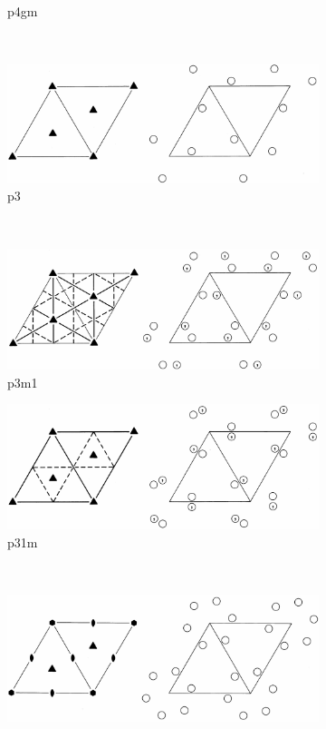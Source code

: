 \documentclass[12pt]{article}
\begin{document}
\begin{figure}
\begin{subfigure}[b]{0.5\textwidth}
        \caption*{p4gm}
    \end{subfigure}\\    
    \begin{subfigure}[b]{0.45\textwidth}
        \centering
        \includegraphics[width=\textwidth]{planegroups/13.png}
        \caption*{p3}
    \end{subfigure}
    ~
    \begin{subfigure}[b]{0.45\textwidth}
        \centering
        \includegraphics[width=\textwidth]{planegroups/14.png}
        \caption*{p3m1}
    \end{subfigure}
    \begin{subfigure}[b]{0.45\textwidth}
        \centering
        \includegraphics[width=\textwidth]{planegroups/15.png}
        \caption*{p31m}
    \end{subfigure}\\
    \begin{subfigure}[b]{0.45\textwidth}
        \centering
        \includegraphics[width=\textwidth]{planegroups/16.png}

\end{subfigure}
\end{figure}
\end{document}
